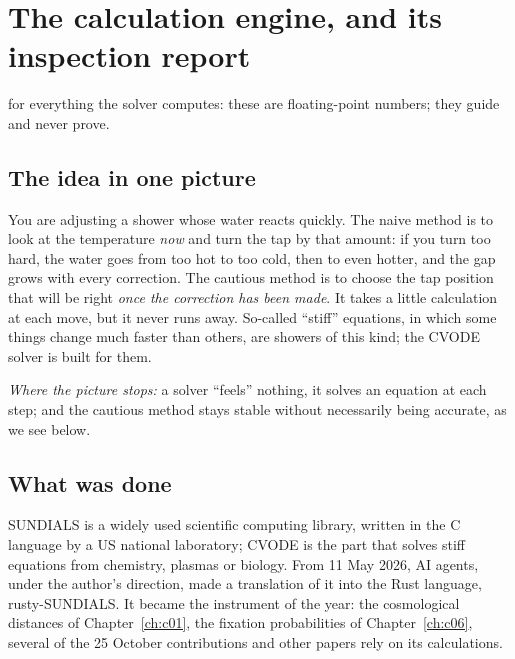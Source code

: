 \chapter[The calculation engine]{The calculation engine, and its inspection report}

\noindent{} for everything the solver computes: these are floating-point numbers; they guide and never
prove.

\section*{The idea in one picture}

\begin{analogie}
You are adjusting a shower whose water reacts quickly. The naive method is to look at the temperature \emph{now}
and turn the tap by that amount: if you turn too hard, the water goes from too hot to too cold, then to even
hotter, and the gap grows with every correction. The cautious method is to choose the tap position that will be
right \emph{once the correction has been made}. It takes a little calculation at each move, but it never runs
away. So-called ``stiff'' equations, in which some things change much faster than others, are showers of this
kind; the CVODE solver is built for them.

\emph{Where the picture stops:} a solver ``feels'' nothing, it solves an equation at each step; and the cautious
method stays stable without necessarily being accurate, as we see below.
\end{analogie}

\section*{What was done}

SUNDIALS is a widely used scientific computing library, written in the C language by a US national laboratory;
CVODE is the part that solves stiff equations from chemistry, plasmas or biology. From 11 May 2026, AI agents,
under the author's direction, made a translation of it into the Rust language, rusty-SUNDIALS. It became the
instrument of the year: the cosmological distances of Chapter~\ref{ch:c01}, the fixation probabilities of Chapter~\ref{ch:c06}, several
of the 25 October contributions and other papers rely on its calculations.

